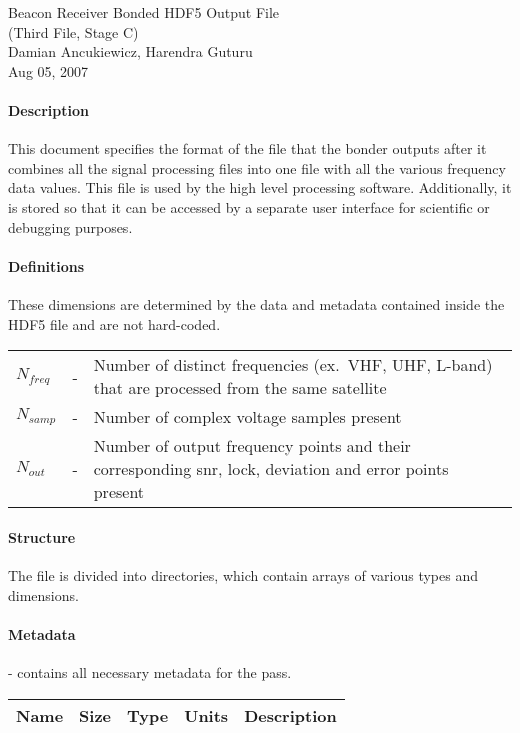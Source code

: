 \documentclass[12pt]{article}
\begin{document}
\begin{center}
\Large{Beacon Receiver Bonded HDF5 Output File}\\
\large{(Third File, Stage C)}\\
\large{Damian Ancukiewicz, Harendra Guturu}\\
\large{Aug 05, 2007}
\end{center}

\begin{small}
\paragraph{Description}
This document specifies the format of the file that the bonder outputs after  it
combines all the signal processing files into one file with all the various frequency data values. This file is used by the high level processing software. Additionally, it is stored so that it can be accessed by a separate user interface for scientific or debugging purposes.
\paragraph{Definitions}
These dimensions are determined by the data and metadata contained inside the HDF5 file and are not hard-coded.\\

\begin{tabular}{l c p{10cm}}
$N_{freq}$ &-& Number of distinct frequencies (ex.~VHF, UHF, L-band) that are processed from the same satellite \\
$N_{samp}$ &-& Number of complex voltage samples present\\
$N_{out}$ &-& Number of output frequency points and their corresponding snr, lock, deviation and error points present\\
\end{tabular}

\paragraph{Structure}
The file is divided into directories, which contain arrays of various types and dimensions. 

\paragraph{Metadata}- contains all necessary metadata for the pass.\\
\begin{scriptsize}
\begin{tabular}{|l|l|l|c|p{7cm}|}
\hline
\textbf{Name} & \textbf{Size} & \textbf{Type} & \textbf{Units} & \textbf{Description} \\
\hline


\end{tabular}
\end{scriptsize}
\end{small}
\end{document}
